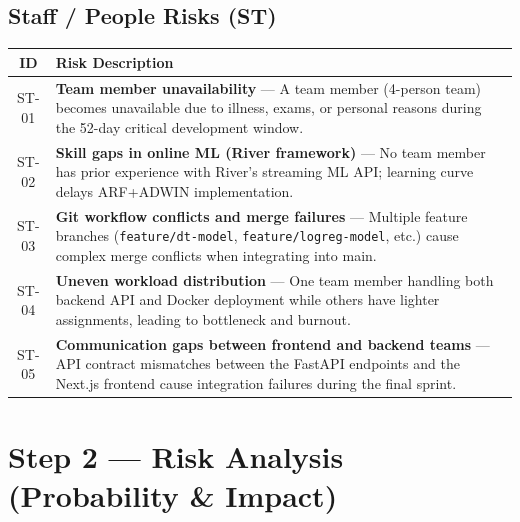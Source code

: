 \documentclass[11pt, a4paper]{article}
\newcommand{\col}[1]{\texttt{\small #1}}
\begin{document}
\subsection{Staff / People Risks (ST)}

\small
\begin{longtable}{|c|p{13cm}|}
\hline
\rowcolor{blue!10}
\textbf{ID} & \textbf{Risk Description} \\
\hline
\endfirsthead

ST-01 & \textbf{Team member unavailability} --- A team member (4-person team) becomes unavailable due to illness, exams, or personal reasons during the 52-day critical development window. \\
\hline
ST-02 & \textbf{Skill gaps in online ML (River framework)} --- No team member has prior experience with River's streaming ML API; learning curve delays ARF+ADWIN implementation. \\
\hline
ST-03 & \textbf{Git workflow conflicts and merge failures} --- Multiple feature branches (\col{feature/dt-model}, \col{feature/logreg-model}, etc.) cause complex merge conflicts when integrating into main. \\
\hline
ST-04 & \textbf{Uneven workload distribution} --- One team member handling both backend API and Docker deployment while others have lighter assignments, leading to bottleneck and burnout. \\
\hline
ST-05 & \textbf{Communication gaps between frontend and backend teams} --- API contract mismatches between the FastAPI endpoints and the Next.js frontend cause integration failures during the final sprint. \\
\hline
\end{longtable}
\normalsize

\newpage

\section{Step 2 --- Risk Analysis (Probability \& Impact)}
\label{sec:analysis}
\end{document}
